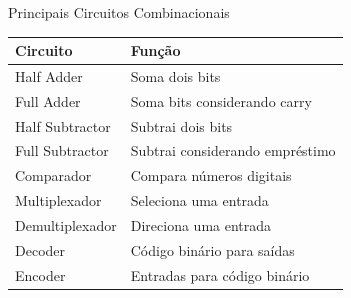 \begin{frame}{Principais Circuitos Combinacionais}

    \begin{center}
        \begin{tabular}{l l}
            \hline
            \textbf{Circuito} & \textbf{Função} \\
            \hline
            Half Adder & Soma dois bits \\
            Full Adder & Soma bits considerando carry \\
            Half Subtractor & Subtrai dois bits \\
            Full Subtractor & Subtrai considerando empréstimo \\
            Comparador & Compara números digitais \\
            Multiplexador & Seleciona uma entrada \\
            Demultiplexador & Direciona uma entrada \\
            Decoder & Código binário para saídas \\
            Encoder & Entradas para código binário \\
            \hline
        \end{tabular}
    \end{center}

\end{frame}